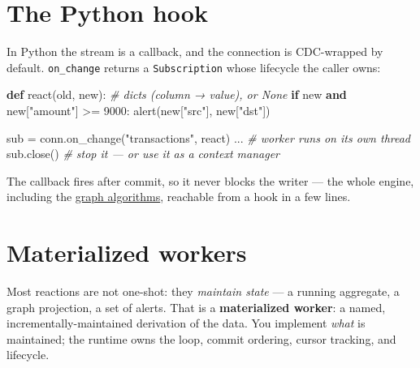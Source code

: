 \documentclass[
  11pt,
  openany]{book}
\newenvironment{Shaded}{}{}
\newcommand{\CommentTok}[1]{\textcolor[rgb]{0.38,0.63,0.69}{\textit{#1}}}
\newcommand{\ControlFlowTok}[1]{\textcolor[rgb]{0.00,0.44,0.13}{\textbf{#1}}}
\newcommand{\DecValTok}[1]{\textcolor[rgb]{0.25,0.63,0.44}{#1}}
\newcommand{\KeywordTok}[1]{\textcolor[rgb]{0.00,0.44,0.13}{\textbf{#1}}}
\newcommand{\NormalTok}[1]{#1}
\newcommand{\OperatorTok}[1]{\textcolor[rgb]{0.40,0.40,0.40}{#1}}
\newcommand{\StringTok}[1]{\textcolor[rgb]{0.25,0.44,0.63}{#1}}
\begin{document}
\section{The Python hook}\label{the-python-hook}

In Python the stream is a callback, and the connection is CDC-wrapped by
default. \texttt{on\_change} returns a \texttt{Subscription} whose
lifecycle the caller owns:

\begin{Shaded}
\begin{Highlighting}[]
\KeywordTok{def}\NormalTok{ react(old, new):                     }\CommentTok{\# dicts (column → value), or None}
    \ControlFlowTok{if}\NormalTok{ new }\KeywordTok{and}\NormalTok{ new[}\StringTok{"amount"}\NormalTok{] }\OperatorTok{\textgreater{}=} \DecValTok{9000}\NormalTok{:}
\NormalTok{        alert(new[}\StringTok{"src"}\NormalTok{], new[}\StringTok{"dst"}\NormalTok{])}

\NormalTok{sub }\OperatorTok{=}\NormalTok{ conn.on\_change(}\StringTok{"transactions"}\NormalTok{, react)}
\NormalTok{...                                       }\CommentTok{\# worker runs on its own thread}
\NormalTok{sub.close()                              }\CommentTok{\# stop it — or use it as a context manager}
\end{Highlighting}
\end{Shaded}

The callback fires after commit, so it never blocks the writer --- the
whole engine, including the \href{../graph/algorithms.md}{graph
algorithms}, reachable from a hook in a few lines.

\section{Materialized workers}\label{materialized-workers}

Most reactions are not one-shot: they \emph{maintain state} --- a
running aggregate, a graph projection, a set of alerts. That is a
\textbf{materialized worker}: a named, incrementally-maintained
derivation of the data. You implement \emph{what} is maintained; the
runtime owns the loop, commit ordering, cursor tracking, and lifecycle.
\end{document}

